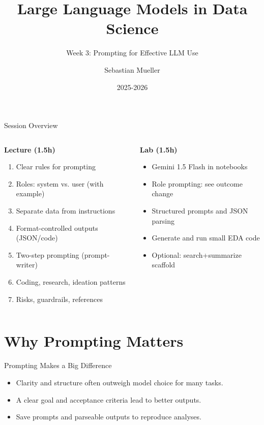 \documentclass[aspectratio=169]{beamer}
\title{Large Language Models in Data Science}
\subtitle{Week 3: Prompting for Effective LLM Use}
\author{Sebastian Mueller}
\institute{Aix-Marseille Universit\'e}
\date{2025-2026}
\begin{document}
\begin{frame}[plain]
  \titlepage
\end{frame}

\begin{frame}{Session Overview}
  \begin{columns}[T,onlytextwidth]
    \begin{column}{0.55\linewidth}
      \textbf{Lecture (1.5h)}
      \begin{enumerate}
        \item Clear rules for prompting
        \item Roles: system vs. user (with example)
        \item Separate data from instructions
        \item Format-controlled outputs (JSON/code)
        \item Two-step prompting (prompt-writer)
        \item Coding, research, ideation patterns
        \item Risks, guardrails, references
      \end{enumerate}
    \end{column}
    \begin{column}{0.4\linewidth}
      \textbf{Lab (1.5h)}
      \begin{itemize}
        \item Gemini 1.5 Flash in notebooks
        \item Role prompting: see outcome change
        \item Structured prompts and JSON parsing
        \item Generate and run small EDA code
        \item Optional: search+summarize scaffold
      \end{itemize}
    \end{column}
  \end{columns}
\end{frame}

\section{Why Prompting Matters}

\begin{frame}{Prompting Makes a Big Difference}
  \begin{itemize}
    \item Clarity and structure often outweigh model choice for many tasks.
    \item A clear goal and acceptance criteria lead to better outputs.
    \item Save prompts and parseable outputs to reproduce analyses.
  \end{itemize}
\end{frame}
\end{document}
